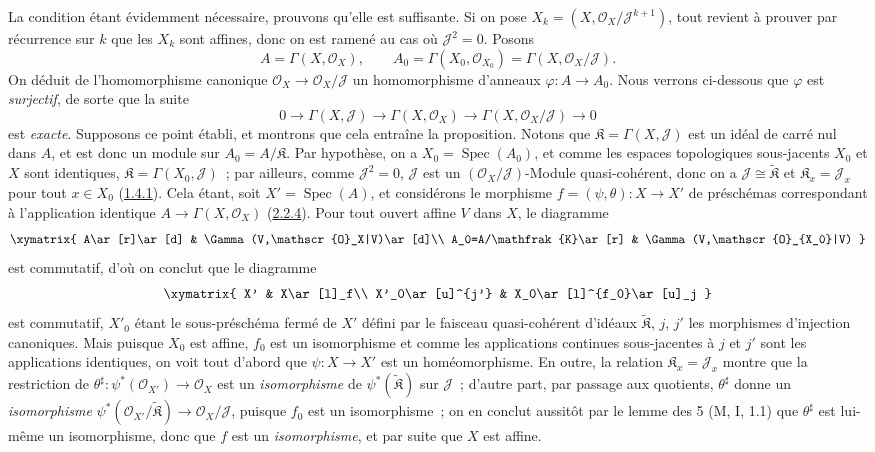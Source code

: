 La condition étant évidemment nécessaire, prouvons qu'elle est suffisante.
Si on pose $X_k=(X,\mathscr{O}_X/\mathscr{J}^{k+1})$, tout revient à prouver
par récurrence sur $k$ que les $X_k$ sont affines, donc on est ramené au cas
où $\mathscr{J}^2=0$. Posons
\[
  A=\Gamma(X,\mathscr{O}_X),\qquad
  A_0=\Gamma(X_0,\mathscr{O}_{X_0})
      =\Gamma(X,\mathscr{O}_X/\mathscr{J}).
\]
On déduit de l'homomorphisme canonique
$\mathscr{O}_X\to\mathscr{O}_X/\mathscr{J}$ un homomorphisme d'anneaux
$\varphi:A\to A_0$. Nous verrons ci-dessous que $\varphi$ est
\emph{surjectif}, de sorte que la suite
\[
  0\to\Gamma(X,\mathscr{J})\to\Gamma(X,\mathscr{O}_X)
  \to\Gamma(X,\mathscr{O}_X/\mathscr{J})\to 0
  \tag{5.1.9.1}\label{I.5.1.9.1-fr}
\]
est \emph{exacte}. Supposons ce point établi, et montrons que cela entraîne la
proposition. Notons que $\mathfrak{K}=\Gamma(X,\mathscr{J})$ est un idéal de
carré nul dans $A$, et est donc un module sur $A_0=A/\mathfrak{K}$. Par
hypothèse, on a $X_0=\operatorname{Spec}(A_0)$, et comme les espaces
topologiques sous-jacents $X_0$ et $X$ sont identiques,
$\mathfrak{K}=\Gamma(X_0,\mathscr{J})$~; par ailleurs, comme
$\mathscr{J}^2=0$, $\mathscr{J}$ est un
$(\mathscr{O}_X/\mathscr{J})$-Module quasi-cohérent, donc on a
$\mathscr{J}\cong\widetilde{\mathfrak{K}}$ et
$\mathfrak{K}_x=\mathscr{J}_x$ pour tout $x\in X_0$
(\hyperref[I.1.4.1-fr]{1.4.1}).
Cela étant, soit $X'=\operatorname{Spec}(A)$, et considérons le morphisme
$f=(\psi,\theta):X\to X'$ de préschémas correspondant à l'application
identique $A\to\Gamma(X,\mathscr{O}_X)$
(\hyperref[I.2.2.4-fr]{2.2.4}). Pour tout ouvert affine $V$ dans $X$, le
diagramme
\[
  \xymatrix{
    A\ar[r]\ar[d] & \Gamma(V,\mathscr{O}_X|V)\ar[d]\\
    A_0=A/\mathfrak{K}\ar[r] & \Gamma(V,\mathscr{O}_{X_0}|V)
  }
\]
est commutatif, d'où on conclut que le diagramme
\[
  \xymatrix{
    X' & X\ar[l]_f\\
    X'_0\ar[u]^{j'} & X_0\ar[l]^{f_0}\ar[u]_j
  }
\]
est commutatif, $X'_0$ étant le sous-préschéma fermé de $X'$ défini par le
faisceau quasi-cohérent d'idéaux $\widetilde{\mathfrak{K}}$, $j$, $j'$ les
morphismes d'injection canoniques. Mais puisque $X_0$ est affine, $f_0$ est un
isomorphisme et comme les applications continues sous-jacentes à $j$ et $j'$
sont les applications identiques, on voit tout d'abord que
$\psi:X\to X'$ est un homéomorphisme. En outre, la relation
$\mathfrak{K}_x=\mathscr{J}_x$ montre que la restriction de
$\theta^\sharp:\psi^*(\mathscr{O}_{X'})\to\mathscr{O}_X$ est un
\emph{isomorphisme} de $\psi^*(\widetilde{\mathfrak{K}})$ sur $\mathscr{J}$~;
d'autre part, par passage aux quotients, $\theta^\sharp$ donne un
\emph{isomorphisme}
$\psi^*(\mathscr{O}_{X'}/\widetilde{\mathfrak{K}})
\to\mathscr{O}_X/\mathscr{J}$, puisque $f_0$ est un isomorphisme~; on en
conclut aussitôt par le lemme des 5 (M, I, 1.1) que $\theta^\sharp$ est
lui-même un isomorphisme, donc que $f$ est un \emph{isomorphisme}, et par suite
que $X$ est affine.

